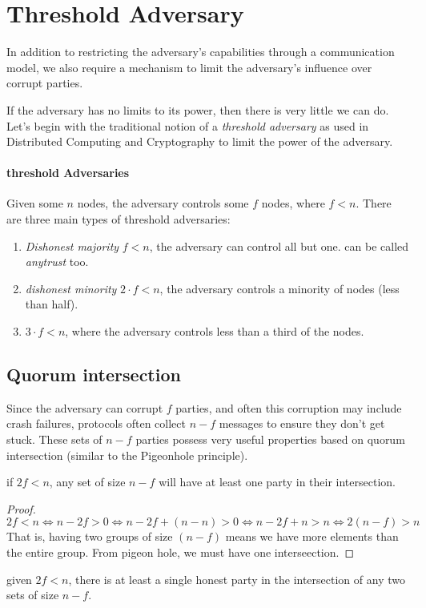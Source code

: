 \section{Threshold Adversary}
In addition to restricting the adversary's capabilities through a communication model,
 we also require a mechanism to limit the adversary's influence over corrupt parties.

If the adversary has no limits to its power, then there is very little we can do.
Let's begin with the traditional notion of a \emph{threshold adversary} as used in Distributed 
Computing and Cryptography to limit the power of the adversary.


\paragraph{threshold Adversaries}
    Given some $n$ nodes, the adversary controls some $f$ nodes, where $f<n$.
    There are three main types of threshold adversaries:
\begin{enumerate}
    \item \emph{Dishonest majority} $f<n$, the adversary can control all but one. can be called \emph{anytrust} too.
    \item \emph{dishonest minority} $2\cdot f<n$, the adversary controls a minority of nodes (less than half).
    \item $3\cdot f < n$, where the adversary controls less than a third of the nodes.
\end{enumerate}

\subsection{Quorum intersection}
Since the adversary can corrupt $f$ parties, and often this corruption may include crash failures,
 protocols often collect $n-f$ messages to ensure they don't get stuck.
  These sets of $n-f$ parties possess very useful properties based on quorum intersection
   (similar to the Pigeonhole principle).

\begin{thm}
    if $2f<n$, any set of size $n-f$  will have at least one party in their
    intersection.
\end{thm} 
 \begin{proof}
    $2f<n \iff n-2f>0 \iff n-2f +(n-n) >0 \iff n-2f+n>n \iff 2(n-f)>n$
    That is, having two groups of size $(n-f)$ means we have more elements than the entire group.
    From pigeon hole, we must have one interseection.
 \end{proof}
 \begin{corollary}
    given $2f<n$, there is at least a single honest party in the intersection of any two sets of size $n-f$.
 \end{corollary}

